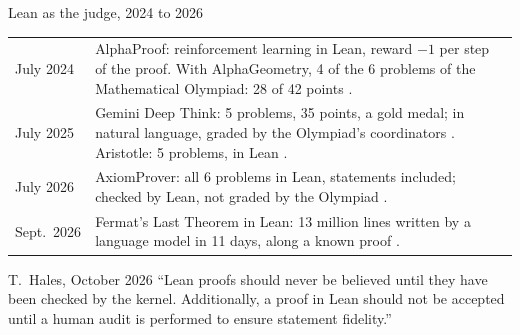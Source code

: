 \documentclass[10pt]{beamer}
\begin{document}
\begin{frame}{Lean as the judge, 2024 to 2026}
\footnotesize
\renewcommand{\arraystretch}{1.25}
\begin{tabularx}{\textwidth}{@{}l >{\raggedright\arraybackslash}X@{}}
\toprule
\alert{July 2024} & AlphaProof: reinforcement learning in Lean, reward $-1$ per step of the proof. With AlphaGeometry, 4 of the 6 problems of the Mathematical Olympiad: 28 of 42 points \citep{hubert2026}. \\
\alert{July 2025} & Gemini Deep Think: 5 problems, 35 points, a gold medal; in natural language, graded by the Olympiad's coordinators \citep{luong2025}. Aristotle: 5 problems, in Lean \citep{achim2025}. \\
\alert{July 2026} & AxiomProver: all 6 problems in Lean, statements included; checked by Lean, not graded by the Olympiad \citep{axiom2026}. \\
\alert{Sept.\ 2026} & Fermat's Last Theorem in Lean: 13 million lines written by a language model in 11 days, along a known proof \citep{anthropic2026b}. \\
\bottomrule
\end{tabularx}

\medskip
\begin{mathbox}{T.~Hales, October 2026 \citep{hales2026}}
``Lean proofs should never be believed until they have been checked by the kernel. Additionally, a proof in Lean should not be accepted until a human audit is performed to ensure statement fidelity.''
\end{mathbox}
\end{frame}
\end{document}

